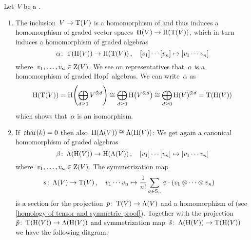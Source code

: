 \documentclass[a4paper,10pt,headings=standardclasses]{scrartcl}
\begin{document}
\begin{example}
  \label{homology of tensor and symmetric}
  Let~$V$ be a {\dgv}.
  \begin{enumerate}
    \item
      The inclusion~$V \to \operatorname{T}(V)$ is a homomorphism of {\dgvs} and thus induces a homomorphism of graded vector spaces~$\operatorname{H}(V) \to \operatorname{H}(\operatorname{T}(V))$, which in turn induces a homomorphism of graded algebras
      \[
        \alpha
        \colon
        \operatorname{T}(\operatorname{H}(V))
        \to
        \operatorname{H}(\operatorname{T}(V)) \,,
        \quad
        [v_1] \dotsm [v_n]
        \mapsto
        [v_1 \dotsm v_n]
      \]
      where~$v_1, \dotsc, v_n \in \operatorname{Z}(V)$.
      We see on representatives that~$\alpha$ is a homomorphism of graded Hopf~algebras.
      We can write~$\alpha$ as
      \[
        \operatorname{H}(\operatorname{T}(V))
        =
        \operatorname{H}\Biggl( \bigoplus_{d \geq 0} V^{\otimes d} \Biggr)
        \cong
        \bigoplus_{d \geq 0} \operatorname{H}\bigl( V^{\otimes d} \bigr)
        \cong
        \bigoplus_{d \geq 0} \operatorname{H}(V)^{\otimes d}
        =
        \operatorname{T}(\operatorname{H}(V))
      \]
      which shows that~$\alpha$ is an isomorphism.
    \item
      If~$\operatorname{char}(k) = 0$ then also~$\operatorname{H}(\operatorname{\Lambda}(V)) \cong \operatorname{\Lambda}(\operatorname{H}(V))$:
      We get again a canonical homomorphism of graded algebras
      \[
        \beta
        \colon
        \operatorname{\Lambda}(\operatorname{H}(V))
        \to
        \operatorname{H}(\operatorname{\Lambda}(V)) \,,
        \quad
        [v_1] \dotsm [v_n]
        \mapsto
        [v_1 \dotsm v_n]
      \]
      where~$v_1, \dotsc, v_n \in \operatorname{Z}(V)$.
      The symmetrization map
      \begin{align*}
        s
        \colon
        \operatorname{\Lambda}(V)
        \to
        \operatorname{T}(V) \,,
        \quad
        v_1 \dotsm v_n
        &\mapsto
        \frac{1}{n!} \sum_{\sigma \in \operatorname{S}_n}
        \sigma \cdot (v_1 \otimes \dotsb \otimes v_n)
      \end{align*}
      is a section for the projection~$p \colon \operatorname{T}(V) \to \operatorname{\Lambda}(V)$ and a homomorphism of {\dgvs} (see \cref{homology of tensor and symmetric proof}).
      Together with the projection~$\tilde{p} \colon \operatorname{T}(\operatorname{H}(V)) \to \operatorname{\Lambda}(\operatorname{H}(V))$ and symmetrization map~$\tilde{s} \colon \operatorname{\Lambda}(\operatorname{H}(V)) \to \operatorname{T}(\operatorname{H}(V))$ we have the following diagram:

\end{enumerate}
\end{example}
\end{document}
